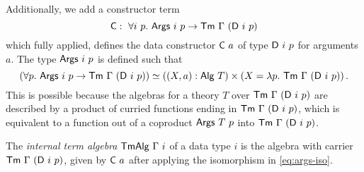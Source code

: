 Additionally, we add a constructor term
\[
\textsf{C} :\ \forall i\ p.\ \textsf{Args}\ i\ p \to \textsf{Tm}\ \Gamma\ (\textsf{D}\ i\ p) \\
\]
which fully applied, defines the data constructor $\mta{C}\ a$ of type
$\textsf{D}\ i\ p$ for arguments $a$. The type $\textsf{Args}\ i\ p$ is defined such
that
\begin{equation}
  (\forall p.\ \textsf{Args}\ i\ p \to \textsf{Tm}\ \Gamma\ (\textsf{D}\ i\ p)) \simeq ((X, a) : \textsf{Alg}\ T) \times (X = \lambda p.\ \textsf{Tm}\ \Gamma\ (\textsf{D}\ i\ p)) \,.\label{eq:args-iso}
\end{equation}
This is possible because the algebras for a theory $T$ over $\textsf{Tm}\ \Gamma\
(\textsf{D}\ i\ p)$ are described by a product of curried functions ending in $\textsf{Tm}\
\Gamma\ (\textsf{D}\ i\ p)$, which is equivalent to a function out of a coproduct
$\textsf{Args}\ T\ p$ into $\Tm\ \Gamma\ (\mta{D}\ i\ p)$.

\begin{definition}
The \emph{internal term algebra} $\textsf{TmAlg}\ \Gamma\ i$ of a data type $i$ is
the algebra with carrier $\Tm\ \Gamma\ (\mta{D}\ i\ p)$, given by $\mta{C}\ a$
after applying the isomorphism in \eqref{eq:args-iso}.
\end{definition}

